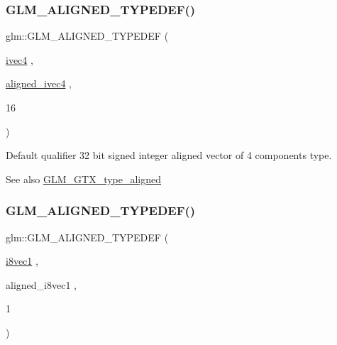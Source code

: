 \subsubsection{\texorpdfstring{G\+L\+M\+\_\+\+A\+L\+I\+G\+N\+E\+D\+\_\+\+T\+Y\+P\+E\+D\+E\+F()}{GLM\_ALIGNED\_TYPEDEF()}\hspace{0.1cm}{\footnotesize\ttfamily [52/209]}}
{\footnotesize\ttfamily glm\+::\+G\+L\+M\+\_\+\+A\+L\+I\+G\+N\+E\+D\+\_\+\+T\+Y\+P\+E\+D\+EF (\begin{DoxyParamCaption}\item[{\hyperlink{group__core__types_gaa4560ddc50320ea8f8a70d5c9c249fea}{ivec4}}]{,  }\item[{\hyperlink{group__gtc__type__aligned_gaa33169a30c7d22a8648f20b4534f635f}{aligned\+\_\+ivec4}}]{,  }\item[{16}]{ }\end{DoxyParamCaption})}

Default qualifier 32 bit signed integer aligned vector of 4 components type. \begin{DoxySeeAlso}{See also}
\hyperlink{group__gtx__type__aligned}{G\+L\+M\+\_\+\+G\+T\+X\+\_\+type\+\_\+aligned} 
\end{DoxySeeAlso}
\mbox{\label{group__gtx__type__aligned_ga9ec20fdfb729c702032da9378c79679f}} 
\subsubsection{\texorpdfstring{G\+L\+M\+\_\+\+A\+L\+I\+G\+N\+E\+D\+\_\+\+T\+Y\+P\+E\+D\+E\+F()}{GLM\_ALIGNED\_TYPEDEF()}\hspace{0.1cm}{\footnotesize\ttfamily [53/209]}}
{\footnotesize\ttfamily glm\+::\+G\+L\+M\+\_\+\+A\+L\+I\+G\+N\+E\+D\+\_\+\+T\+Y\+P\+E\+D\+EF (\begin{DoxyParamCaption}\item[{\hyperlink{group__gtc__type__precision_ga1e3db56de9a181840090416b6a5bd5f7}{i8vec1}}]{,  }\item[{aligned\+\_\+i8vec1}]{,  }\item[{1}]{ }\end{DoxyParamCaption})}


